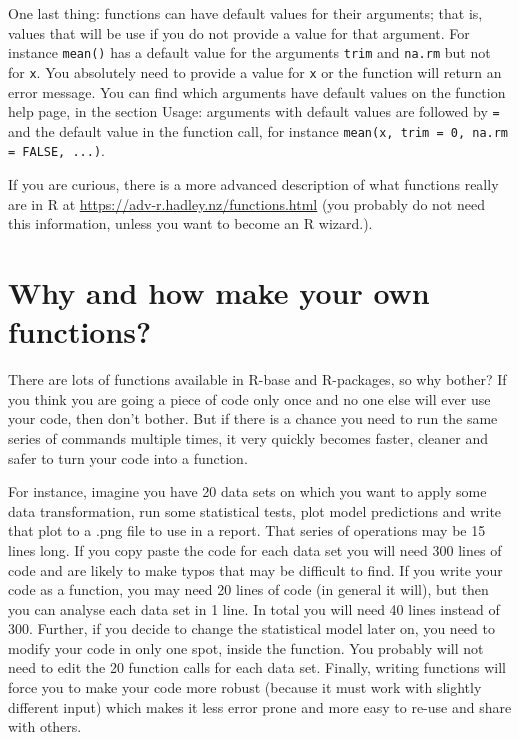 \documentclass[12pt,a4paper]{scrartcl}\usepackage[]{graphicx}\usepackage[]{color}
\begin{document}
One last thing: functions can have default values for their arguments; that is, values that will be use if you do not provide a value for that argument. For instance \texttt{mean()} has a default value for the arguments \texttt{trim} and \texttt{na.rm} but not for \texttt{x}. You absolutely need to provide a value for \texttt{x} or the function will return an error message. You can find which arguments have default values on the function help page, in the section Usage: arguments with default values are followed by \texttt{=} and the default value in the function call, for instance \texttt{mean(x, trim = 0, na.rm = FALSE, ...)}.



If you are curious, there is a more advanced description of what functions really are in R at \url{https://adv-r.hadley.nz/functions.html} (you probably do not need this information, unless you want to become an R wizard.).

\section{Why and how make your own functions?}

There are lots of functions available in R-base and R-packages, so why bother? If you think you are going a piece of code only once and no one else will ever use your code, then don't bother. But if there is a chance you need to run the same series of commands multiple times, it very quickly becomes faster, cleaner and safer to turn your code into a function. 

For instance, imagine you have 20 data sets on which you want to apply some data transformation, run some statistical tests, plot model predictions and write that plot to a .png file to use in a report. That series of operations may be 15 lines long. If you copy paste the code for each data set you will need 300 lines of code and are likely to make typos that may be difficult to find. If you write your code as a function, you may need 20 lines of code (in general it will), but then you can analyse each data set in 1 line. In total you will need 40 lines instead of 300. 
Further, if you decide to change the statistical model later on, you need to modify your code in only one spot, inside the function. You probably will not need to edit the 20 function calls for each data set.
Finally, writing functions will force you to make your code more robust (because it must work with slightly different input) which makes it less error prone and more easy to re-use and share with others. 
\end{document}
